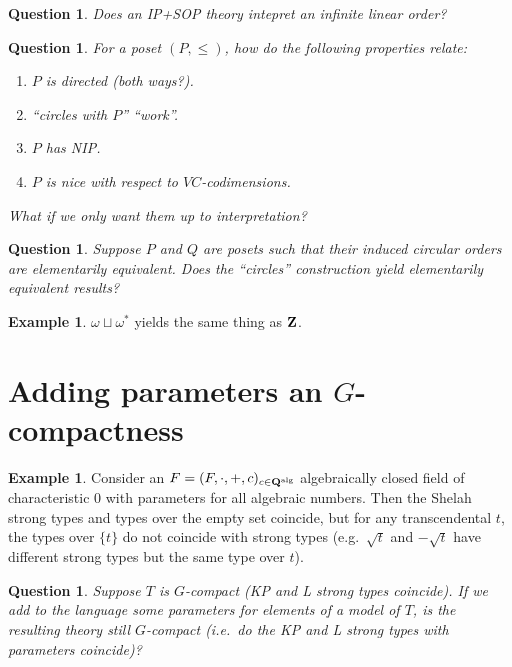 \documentclass[final,a4paper,12pt]{amsart}
\newtheorem{qu}[thm]{Question}
\theoremstyle{remark}
\theoremstyle{definition}
\newtheorem{ex}[thm]{Example}
\begin{document}
	\begin{qu}
		Does an IP+SOP theory intepret an infinite linear order?
	\end{qu}
	
	
	\begin{qu}
		For a poset $(P,\leq)$, how do the following properties relate:
		\begin{enumerate}
			\item
			$P$ is directed (both ways?).
			\item
			``circles with $P$'' ``work''.
			\item
			$P$ has NIP.
			\item
			$P$ is nice with respect to $VC$-codimensions.
		\end{enumerate}
		What if we only want them up to interpretation?
	\end{qu}
	
	\begin{qu}
		Suppose $P$ and $Q$ are posets such that their induced circular orders are elementarily equivalent. Does the ``circles'' construction yield elementarily equivalent results?
	\end{qu}
	
	\begin{ex}
		$\omega\sqcup \omega^*$ yields the same thing as ${\bf Z}$.
	\end{ex}
	
	\section{Adding parameters an $G$-compactness}
	
	\begin{ex}
		Consider an $F=(F,\cdot,+,c)_{c\in {\bf Q}^{\textrm{alg}}}$ algebraically closed field of characteristic $0$ with parameters for all algebraic numbers. Then the Shelah strong types and types over the empty set coincide, but for any transcendental $t$, the types over $\{t\}$ do not coincide with strong types (e.g.\ $\sqrt{t}$ and $-\sqrt{t}$ have different strong types but the same type over $t$).
	\end{ex}
	
	\begin{qu}
		Suppose $T$ is $G$-compact (KP and L strong types coincide). If we add to the language some parameters for elements of a model of $T$, is the resulting theory still $G$-compact (i.e.\ do the KP and L strong types with parameters coincide)?
	\end{qu}
	
\end{document}
